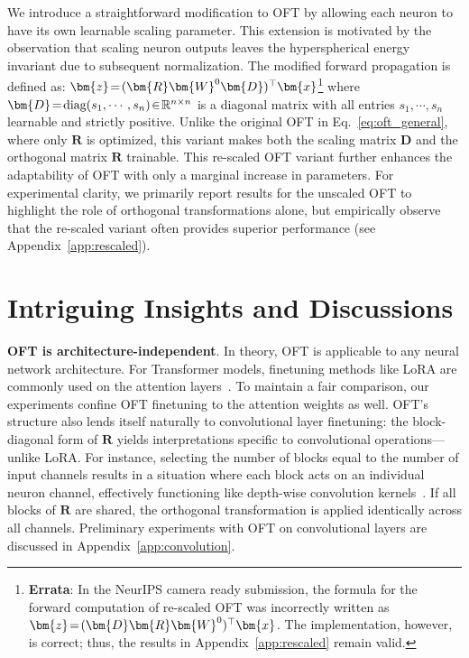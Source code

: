 We introduce a straightforward modification to OFT by allowing each neuron to have its own learnable scaling parameter. This extension is motivated by the observation that scaling neuron outputs leaves the hyperspherical energy invariant due to subsequent normalization. The modified forward propagation is defined as: $\thickmuskip=2mu \medmuskip=2mu\bm{z}=(\bm{R}\bm{W}^0\bm{D})^\top\bm{x}$\footnote{\textbf{Errata}: In the NeurIPS camera ready submission, the formula for the forward computation of re-scaled OFT was incorrectly written as $\thickmuskip=2mu \medmuskip=2mu\bm{z}=(\bm{D}\bm{R}\bm{W}^0)^\top\bm{x}$. The implementation, however, is correct; thus, the results in Appendix~\ref{app:rescaled} remain valid.} where $\thickmuskip=2mu \medmuskip=2mu \bm{D}=\text{diag}(s_1,\cdots,s_n)\in\mathbb{R}^{n\times n}$ is a diagonal matrix with all entries $s_1,\cdots,s_n$ learnable and strictly positive. Unlike the original OFT in Eq.~\eqref{eq:oft_general}, where only $\bm{R}$ is optimized, this variant makes both the scaling matrix $\bm{D}$ and the orthogonal matrix $\bm{R}$ trainable. This re-scaled OFT variant further enhances the adaptability of OFT with only a marginal increase in parameters. For experimental clarity, we primarily report results for the unscaled OFT to highlight the role of orthogonal transformations alone, but empirically observe that the re-scaled variant often provides superior performance (see Appendix~\ref{app:rescaled}).

\section{Intriguing Insights and Discussions}

\textbf{OFT is architecture-independent}. In theory, OFT is applicable to any neural network architecture. For Transformer models, finetuning methods like LoRA are commonly used on the attention layers~\cite{hulora2022}. To maintain a fair comparison, our experiments confine OFT finetuning to the attention weights as well. OFT's structure also lends itself naturally to convolutional layer finetuning: the block-diagonal form of $\bm{R}$ yields interpretations specific to convolutional operations—unlike LoRA. For instance, selecting the number of blocks equal to the number of input channels results in a situation where each block acts on an individual neuron channel, effectively functioning like depth-wise convolution kernels~\cite{chollet2017xception}. If all blocks of $\bm{R}$ are shared, the orthogonal transformation is applied identically across all channels. Preliminary experiments with OFT on convolutional layers are discussed in Appendix~\ref{app:convolution}.

